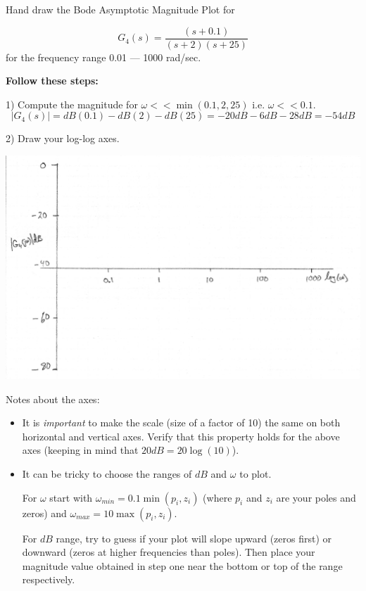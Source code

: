\begin{Example}\label{firstBodeMagexample}
Hand draw the Bode Asymptotic Magnitude Plot for

\[
G_4(s) = \frac  {(s+0.1)}  {(s+2)(s+25)}
\]
for the frequency range 0.01 --- 1000 rad/sec.

{\bf Follow these steps:}

1) Compute the magnitude for $\omega << \min(0.1, 2, 25)$ i.e. $\omega << 0.1$.
\[
|G_4(s)| = dB(0.1) - dB(2) - dB(25) = -20dB - 6dB - 28dB = -54dB
\]

2) Draw your log-log axes.

\includegraphics[width=6.5in]{figs05/00737a.png}

Notes about the axes:
\begin{itemize}
  \item It is {\it important } to make the scale (size of a factor of 10)
  the same on both horizontal and vertical axes.  
  Verify that this property holds for the above axes (keeping in mind that $20dB = 20\log(10)$).
  
  \item It can be tricky to choose the ranges of $dB$ and $\omega$ to plot.

  For $\omega$ start with $\omega_{min} = 0.1 \min(p_i, z_i)$ (where $p_i$ and $z_i$ are your poles and zeros) and $\omega_{max} = 10 \max(p_i,z_i)$.

  For $dB$ range, try to guess if your plot will slope upward (zeros first) or downward (zeros at higher frequencies than poles).  Then place your magnitude value obtained in step one near the bottom or top of the range respectively.
\end{itemize}


\end{Example}



